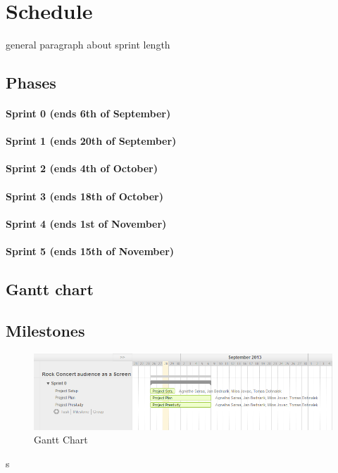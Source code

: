 \documentclass{article}
\begin{document}
  
\section{Schedule}
general paragraph about sprint length
\subsection{Phases}
\paragraph{Sprint 0 (ends 6th of September)}
\paragraph{Sprint 1 (ends 20th of September)}
\paragraph{Sprint 2 (ends 4th of October)}
\paragraph{Sprint 3 (ends 18th of October)}
\paragraph{Sprint 4 (ends 1st of November)}
\paragraph{Sprint 5 (ends 15th of November)}
\subsection{Gantt chart}

\subsection{Milestones}

\begin{figure}[ht]
\begin{center}
    \includegraphics[scale=0.6]{images/gantt}
    \caption{Gantt Chart}
    \label{img:gantt}
\end{center}
\end{figure}
s
\end{document}
